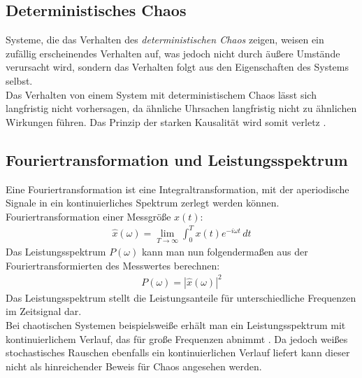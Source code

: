 \subsection{Deterministisches Chaos}
\label{sub:determChaos}
Systeme, die das Verhalten des \textit{deterministischen Chaos} zeigen, weisen ein zufällig erscheinendes Verhalten auf, was jedoch nicht durch äußere Umstände verursacht wird, sondern das Verhalten folgt aus den Eigenschaften des Systems selbst.\\
Das Verhalten von einem System mit deterministischem Chaos lässt sich langfristig nicht vorhersagen, da ähnliche Uhrsachen langfristig nicht zu ähnlichen Wirkungen führen. Das Prinzip der starken Kausalität wird somit verletz \citep{Lueck}.

\subsection{Fouriertransformation und Leistungsspektrum}
\label{sub:fouriertrafo}
Eine Fouriertransformation ist eine Integraltransformation, mit der aperiodische Signale in ein kontinuierliches Spektrum zerlegt werden können.\\
Fouriertransformation einer Messgröße \(x(t)\):
\begin{gather}
    \hat{x}(\omega) = \lim_{T \to \infty} \int_{0}^{T}  x(t) e^{-i\omega t}\,dt 
\end{gather}
Das Leistungsspektrum \( P(\omega)\) kann man nun folgendermaßen aus der Fouriertransformierten des Messwertes berechnen:
\begin{gather}
    P(\omega) = |\hat{x}(\omega)|^2
\end{gather}
Das Leistungsspektrum stellt die Leistungsanteile für unterschiedliche Frequenzen im Zeitsignal dar.\\
Bei chaotischen Systemen beispielsweiße erhält man ein Leistungsspektrum mit kontinuierlichem Verlauf, das für große Frequenzen abnimmt \citep{Lueck}. Da jedoch weißes stochastisches Rauschen ebenfalls ein kontinuierlichen Verlauf liefert kann dieser nicht als hinreichender Beweis für Chaos angesehen werden.

